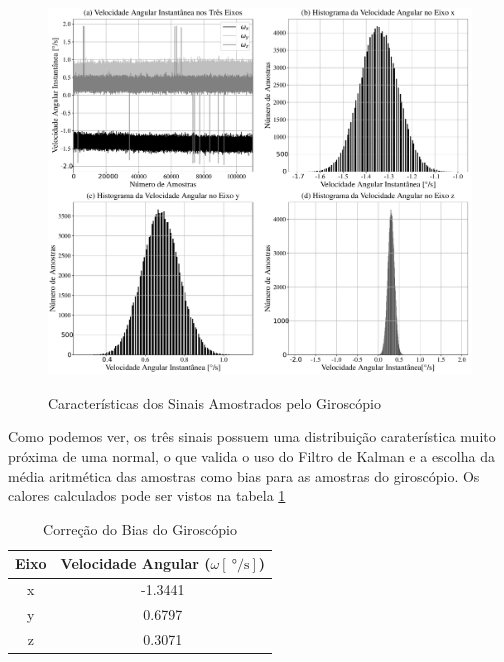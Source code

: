 \begin{figure}[H]
  \caption{Características dos Sinais Amostrados pelo Giroscópio}
      \includegraphics[scale=.4]{metodologia/img/bias_correction}
  \label{fig:bias_correction}
\end{figure}

Como podemos ver, os três sinais possuem uma distribuição caraterística muito próxima de uma normal, o que valida o uso do Filtro de Kalman e a escolha da média aritmética das amostras como bias para as amostras do giroscópio. Os calores calculados pode ser vistos na tabela \ref{tab:bias_correction} 

\begin{table}[H]
  \caption{Correção do Bias do Giroscópio}
  \label{tab:bias_correction}
  \centering%
  \begin{minipage}{.42\textwidth}
    \begin{tabular*}{\textwidth}{cc}
      \hline
      {Eixo} & Velocidade Angular ($\omega [\SI{}{\degree\per\second}]$)\\ \hline
      \hline
      x  &  -1.3441 \\ 
      y  &  0.6797 \\
      z  &  0.3071 \\ \hline
    \end{tabular*}
  \end{minipage}
\end{table}

